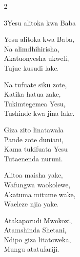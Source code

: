 \begin{multicols}{2}
\begin{hymn}{3}{Yesu alitoka kwa Baba}{}
\begin{stanza}
Yesu alitoka kwa Baba,\\
Na alimdhihirisha,\\
Akatuonyesha ukweli,\\
Tujue kusudi lake.
\end{stanza}
\begin{chorus}
Na tufuate siku zote,\\
Katika hatua zake,\\
Tukimtegemea Yesu,\\
Tushinde kwa jina lake.
\end{chorus}
\begin{stanza}
Giza zito linatawala\\
Pande zote duniani,\\
Kama tukifuata Yesu\\
Tutaenenda nuruni.
\end{stanza}
\begin{stanza}
Alitoa maisha yake,\\
Wafungwa waokolewe,\\
Akatuma mitume wake,\\
Waeleze njia yake.
\end{stanza}
\begin{stanza}
Atakaporudi Mwokozi,\\
Atamshinda Shetani,\\
Ndipo giza litatoweka,\\
Mungu atatufariji.
\end{stanza}
\end{hymn}


\end{multicols}
